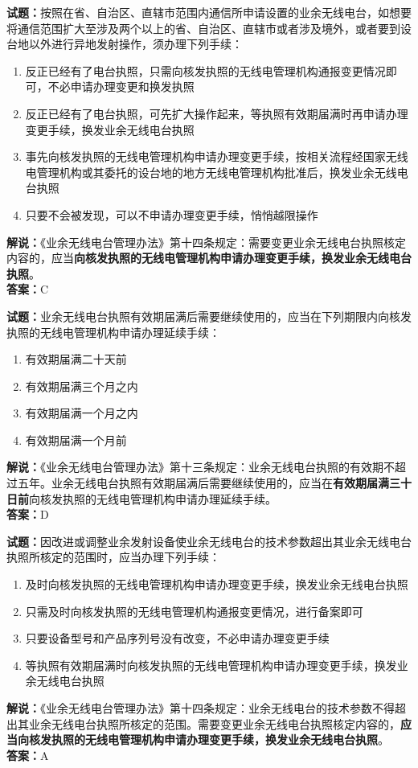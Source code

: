 \documentclass{ctexbook}
\begin{document}
\noindent\textbf{试题：}按照在省、自治区、直辖市范围内通信所申请设置的业余无线电台，如想要将通信范围扩大至涉及两个以上的省、自治区、直辖市或者涉及境外，或者要到设台地以外进行异地发射操作，须办理下列手续：
\begin{enumerate}[leftmargin=3em]
\item 反正已经有了电台执照，只需向核发执照的无线电管理机构通报变更情况即可，不必申请办理变更和换发执照
\item 反正已经有了电台执照，可先扩大操作起来，等执照有效期届满时再申请办理变更手续，换发业余无线电台执照
\item 事先向核发执照的无线电管理机构申请办理变更手续，按相关流程经国家无线电管理机构或其委托的设台地的地方无线电管理机构批准后，换发业余无线电台执照
\item 只要不会被发现，可以不申请办理变更手续，悄悄越限操作
\end{enumerate}
\noindent\textbf{解说：}《业余无线电台管理办法》第十四条规定：需要变更业余无线电台执照核定内容的，应当\textbf{向核发执照的无线电管理机构申请办理变更手续，换发业余无线电台执照}。\\\noindent\textbf{答案：}C

\bigskip




\noindent\textbf{试题：}业余无线电台执照有效期届满后需要继续使用的，应当在下列期限内向核发执照的无线电管理机构申请办理延续手续：
\begin{enumerate}[leftmargin=3em]
\item 有效期届满二十天前
\item 有效期届满三个月之内
\item 有效期届满一个月之内
\item 有效期届满一个月前
\end{enumerate}
\noindent\textbf{解说：}《业余无线电台管理办法》第十三条规定：业余无线电台执照的有效期不超过五年。业余无线电台执照有效期届满后需要继续使用的，应当在\textbf{有效期届满三十日前}向核发执照的无线电管理机构申请办理延续手续。\\\noindent\textbf{答案：}D

\bigskip




\noindent\textbf{试题：}因改进或调整业余发射设备使业余无线电台的技术参数超出其业余无线电台执照所核定的范围时，应当办理下列手续：
\begin{enumerate}[leftmargin=3em]
\item 及时向核发执照的无线电管理机构申请办理变更手续，换发业余无线电台执照
\item 只需及时向核发执照的无线电管理机构通报变更情况，进行备案即可
\item 只要设备型号和产品序列号没有改变，不必申请办理变更手续
\item 等执照有效期届满时向核发执照的无线电管理机构申请办理变更手续，换发业余无线电台执照
\end{enumerate}
\noindent\textbf{解说：}《业余无线电台管理办法》第十四条规定：业余无线电台的技术参数不得超出其业余无线电台执照所核定的范围。需要变更业余无线电台执照核定内容的，\textbf{应当向核发执照的无线电管理机构申请办理变更手续，换发业余无线电台执照}。\\\noindent\textbf{答案：}A
\end{document}

